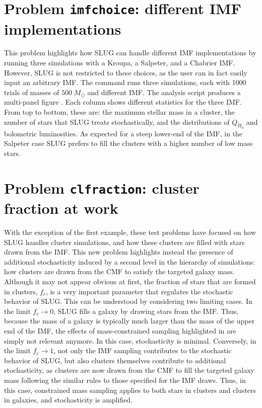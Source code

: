 \documentclass[letterpaper,10pt,english]{sphinxmanual}
\begin{document}
\section{Problem \texttt{imfchoice}: different IMF implementations}
\label{tests:problem-imfchoice-different-imf-implementations}\label{tests:probimf-label}
This problem highlights how SLUG can handle different IMF implementations by running
three simulations with a Kroupa, a Salpeter, and a Chabrier IMF. However, SLUG is not
restricted to these choices, as the user can in fact easily input an arbitrary IMF.
The command   runs three  simulations, each with 1000 trials
of masses of \(500\;M_\odot\) and different IMF. The analysis script
 produces a multi-panel figure .
Each column shows different statistics for the three IMF. From top to bottom, these are:
the maximum stellar mass in a cluster, the number of stars that SLUG treats stochastically,
and the distributions of \(Q_{H_0}\)  and bolometric luminosities.
As expected for a steep lower-end of the IMF, in the Salpeter case SLUG prefers to fill the
clusters with a higher number of low mass stars.


\section{Problem \texttt{clfraction}: cluster fraction at work}
\label{tests:problem-clfraction-cluster-fraction-at-work}
With the exception of the first example, these test problems have focused on how SLUG handles
cluster simulations, and how these clusters are filled with stars drawn from the IMF.
This new problem highlights instead the presence of additional stochasticity induced by a
second level in the hierarchy of  simulations: how clusters are drawn from the CMF to satisfy the
targeted galaxy mass. Although it may not appear obvious at first,
the fraction of stars that are formed in clusters, \(f_c\), is a very important parameter that regulates
the stochastic behavior of SLUG. This can be understood by considering two limiting cases.
In the limit \(f_c \rightarrow 0\), SLUG fills a galaxy by drawing stars from the
IMF. Thus, because the mass of a galaxy is typically much larger than the mass of the upper
end of the IMF, the effects of mass-constrained sampling highlighted in {\hyperref[tests:probsampl-label]{\emph{}}} are simply
not relevant anymore. In this case, stochasticity is minimal.
Conversely, in the limit \(f_c \rightarrow 1\), not only the IMF sampling contributes to the
stochastic behavior of SLUG, but also clusters themselves contribute to additional stochasticity,
as clusters are now drawn from the CMF to fill the targeted galaxy mass following the similar rules
to those specified for the IMF draws. Thus, in this case, constrained mass sampling applies to both
stars in clusters and clusters in galaxies, and stochasticity is amplified.
\end{document}
